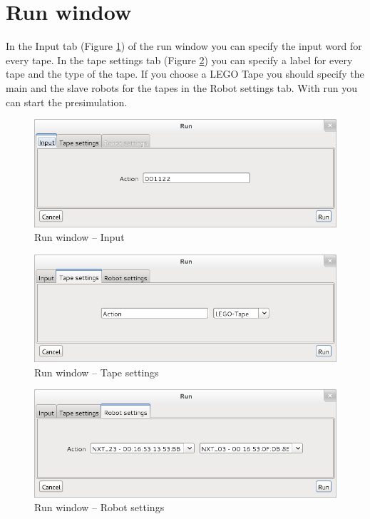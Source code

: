 \documentclass[%
  a4paper,%
  11pt,%
  blue,%
  hyperref	%
  ]{tubsartcl}
\begin{document}
\clearpage

\section{Run window}
In the Input tab (Figure \ref{pic:run_window_input}) of the run window you can specify the input word for every tape. In the tape settings tab (Figure \ref{pic:run_window_tape_settings}) you can specify a label for every tape and the type of the tape. If you choose a LEGO Tape you should specify the main and the slave robots for the tapes in the Robot settings tab. With run you can start the presimulation.
\begin{figure}[!htb]
\begin{center}
\includegraphics[scale=0.5]{graphics_gui/run_window_input.png}
\end{center}
\caption{Run window -- Input}
\label{pic:run_window_input}
\end{figure}


\begin{figure}[!htb]
\begin{center}
\includegraphics[scale=0.5]{graphics_gui/run_window_tape_settings.png}
\end{center}
\caption{Run window -- Tape settings}
\label{pic:run_window_tape_settings}
\end{figure}


\begin{figure}[!htb]
\begin{center}
\includegraphics[scale=0.5]{graphics_gui/run_window_robot_settings.png}
\end{center}
\caption{Run window -- Robot settings}
\label{pic:run_window_robot_settings}
\end{figure}
 
\end{document}
